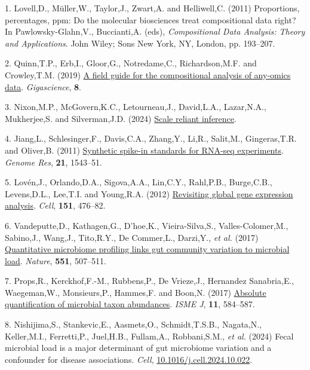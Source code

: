 \documentclass[
]{article}
\newlength{\cslhangindent}
\newenvironment{CSLReferences}[2] %
 {\begin{list}{}{%
  \setlength{\itemindent}{0pt}
  \setlength{\leftmargin}{0pt}
  \setlength{\parsep}{0pt}
  \ifodd #1
   \setlength{\leftmargin}{\cslhangindent}
   \setlength{\itemindent}{-1\cslhangindent}
  \fi
  \setlength{\itemsep}{#2\baselineskip}}}
 {\end{list}}
\begin{document}
\label{refs}
\begin{CSLReferences}{1}{1}
1. Lovell,D., Müller,W., Taylor,J., Zwart,A. and Helliwell,C. (2011)
Proportions, percentages, ppm: Do the molecular biosciences treat
compositional data right? In Pawlowsky-Glahn,V., Buccianti,A. (eds),
\emph{Compositional Data Analysis: Theory and Applications}. John Wiley;
Sons New York, NY, London, pp. 193--207.

2. Quinn,T.P., Erb,I., Gloor,G., Notredame,C., Richardson,M.F. and
Crowley,T.M. (2019) \href{https://doi.org/10.1093/gigascience/giz107}{A
field guide for the compositional analysis of any-omics data}.
\emph{Gigascience}, \textbf{8}.

3. Nixon,M.P., McGovern,K.C., Letourneau,J., David,L.A., Lazar,N.A.,
Mukherjee,S. and Silverman,J.D. (2024)
\href{https://arxiv.org/abs/2201.03616}{Scale reliant inference}.

4. Jiang,L., Schlesinger,F., Davis,C.A., Zhang,Y., Li,R., Salit,M.,
Gingeras,T.R. and Oliver,B. (2011)
\href{https://doi.org/10.1101/gr.121095.111}{Synthetic spike-in
standards for RNA-seq experiments}. \emph{Genome Res}, \textbf{21},
1543--51.

5. Lovén,J., Orlando,D.A., Sigova,A.A., Lin,C.Y., Rahl,P.B., Burge,C.B.,
Levens,D.L., Lee,T.I. and Young,R.A. (2012)
\href{https://doi.org/10.1016/j.cell.2012.10.012}{Revisiting global gene
expression analysis}. \emph{Cell}, \textbf{151}, 476--82.

6. Vandeputte,D., Kathagen,G., D'hoe,K., Vieira-Silva,S.,
Valles-Colomer,M., Sabino,J., Wang,J., Tito,R.Y., De Commer,L.,
Darzi,Y., \emph{et al.} (2017)
\href{https://doi.org/10.1038/nature24460}{Quantitative microbiome
profiling links gut community variation to microbial load}.
\emph{Nature}, \textbf{551}, 507--511.

7. Props,R., Kerckhof,F.-M., Rubbens,P., De Vrieze,J., Hernandez
Sanabria,E., Waegeman,W., Monsieurs,P., Hammes,F. and Boon,N. (2017)
\href{https://doi.org/10.1038/ismej.2016.117}{Absolute quantification of
microbial taxon abundances}. \emph{ISME J}, \textbf{11}, 584--587.

8. Nishijima,S., Stankevic,E., Aasmets,O., Schmidt,T.S.B., Nagata,N.,
Keller,M.I., Ferretti,P., Juel,H.B., Fullam,A., Robbani,S.M., \emph{et
al.} (2024) Fecal microbial load is a major determinant of gut
microbiome variation and a confounder for disease associations.
\emph{Cell},
\href{https://doi.org/10.1016/j.cell.2024.10.022}{10.1016/j.cell.2024.10.022}.


\end{CSLReferences}
\end{document}
